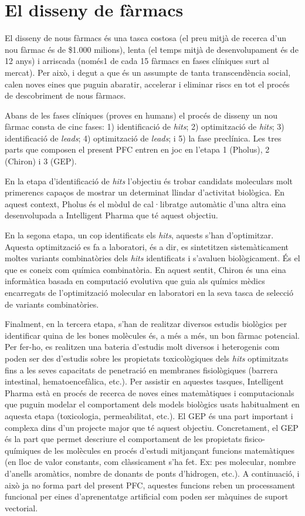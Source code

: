 \section{El disseny de fàrmacs}

El disseny de nous fàrmacs és una tasca costosa (el preu mitjà de recerca d'un
nou fàrmac és de \$1.000 milions), lenta (el temps mitjà de desenvolupament és de
12 anys) i arriscada (només1 de cada 15 fàrmacs en fases clíniques surt al
mercat). Per això, i degut a que és un assumpte de tanta transcendència social,
calen noves eines que puguin abaratir, accelerar i eliminar riscs en tot el
procés de descobriment de nous fàrmacs.

Abans de les fases clíniques (proves en humans) el procés de disseny un nou fàrmac consta de cinc fases: 1) identificació de \emph{hits}; 2) optimització de \emph{hits}; 3) identificació de \emph{leads}; 4) optimització de \emph{leads}; i 5) la fase preclínica. Les tres parts que composen el present PFC entren en joc en l'etapa 1 (Pholus), 2 (Chiron) i 3 (GEP).

En la etapa d'identificació de \emph{hits} l'objectiu és trobar candidats
moleculars molt primerencs capaços de mostrar un determinat llindar d'activitat
biològica. En aquest context, Pholus és el mòdul de cal·libratge automàtic d'una
altra eina desenvolupada a Intelligent Pharma que té aquest objectiu.

En la segona etapa, un cop identificats els \emph{hits}, aquests s'han
d'optimitzar. Aquesta optimització es fa a laboratori, és a dir, es sintetitzen
sistemàticament moltes variants combinatòries dels \emph{hits} identificats i
s'avaluen biològicament. És el que es coneix com química combinatòria. En aquest
sentit, Chiron és una eina informàtica basada en computació evolutiva que guia
als químics mèdics encarregats de l'optimització molecular en laboratori en la
seva tasca de selecció de variants combinatòries.

Finalment, en la tercera etapa, s'han de realitzar diversos estudis biològics
per identificar quina de les bones molècules és, a més a més, un bon fàrmac
potencial. Per fer-ho, es realitzen una bateria d'estudis molt diversos i
heterogenis com poden ser des d'estudis sobre les propietats toxicològiques dels
\emph{hits} optimitzats fins a les seves capacitats de penetració en membranes
fisiològiques (barrera intestinal, hematoencefàlica, etc.). Per assistir en
aquestes tasques, Intelligent Pharma està en procés de recerca de noves eines
matemàtiques i computacionals que puguin modelar el comportament dels models
biològics usats habitualment en aquesta etapa (toxicologia, permeabilitat,
etc.). El GEP és una part important i complexa dins d'un projecte major que té
aquest objectiu. Concretament, el GEP és la part que permet descriure el
comportament de les propietats fisico-químiques de les molècules en procés
d'estudi mitjançant funcions matemàtiques (en lloc de valor constants, com
clàssicament s'ha fet. Ex: pes molecular, nombre d'anells aromàtics, nombre de
donants de ponts d'hidrogen, etc.). A continuació, i això ja no forma part del
present PFC, aquestes funcions reben un processament funcional per eines
d'aprenentatge artificial com poden ser màquines de suport vectorial.

